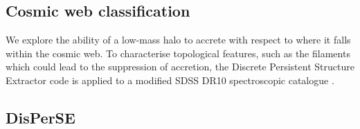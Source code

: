 \subsection{Cosmic web classification} \label{sec:cw_classification_hab}
We explore the ability of a low-mass halo to accrete with respect to where it falls within the cosmic web. 
To characterise topological features, such as the filaments which could lead to the suppression of accretion, the Discrete Persistent Structure Extractor code \citep[DisPerSE;][]{sousbie2011a,sousbie2011b} is applied to a modified SDSS DR10 spectroscopic catalogue \citep{tempel2014}. 

\subsection{DisPerSE}



